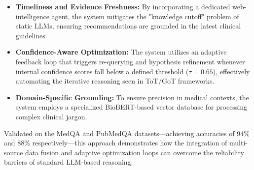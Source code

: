 \begin{itemize}
    \item \textbf{Timeliness and Evidence Freshness:} By incorporating a dedicated web-intelligence agent, the system mitigates the "knowledge cutoff" problem of static LLMs, ensuring recommendations are grounded in the latest clinical guidelines.
    \item \textbf{Confidence-Aware Optimization:} The system utilizes an adaptive feedback loop that triggers re-querying and hypothesis refinement whenever internal confidence scores fall below a defined threshold ($\tau = 0.65$), effectively automating the iterative reasoning seen in ToT/GoT frameworks.
    \item \textbf{Domain-Specific Grounding:} To ensure precision in medical contexts, the system employs a specialized BioBERT-based vector database for processing complex clinical jargon.
\end{itemize}

Validated on the MedQA and PubMedQA datasets—achieving accuracies of 94\% and 88\% respectively—this approach demonstrates how the integration of multi-source data fusion and adaptive optimization loops can overcome the reliability barriers of standard LLM-based reasoning.
